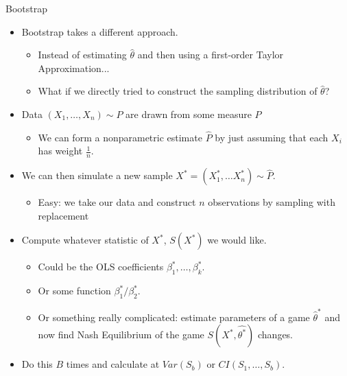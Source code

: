 \begin{frame}[allowframebreaks]{Bootstrap}
\vspace{-10pt}
  \begin{itemize}
  \item Bootstrap takes a different approach.
  \begin{itemize}
  \item Instead of estimating $\hat{\theta}$ and then using a first-order Taylor Approximation...
  \item What if we directly tried to construct the \alert{sampling distribution} of $\hat{\theta}$?
  \end{itemize}
  
\framebreak
 
  \item Data $(X_1,\ldots,X_n) \sim P$ are drawn from some measure $P$
  \begin{itemize}
  \item We can form a \alert{nonparametric estimate} $\hat{P}$ by just assuming that each $X_i$ has weight $\frac{1}{n}$.
  \end{itemize}
  \item We can then simulate a new sample $X^{*} = (X_1^{*},\ldots X_n^{*}) \sim \hat{P}$.
  \begin{itemize}
  \item Easy: we take our data and construct $n$ observations by \alert{sampling with replacement} 
  \end{itemize}
  \item Compute whatever statistic of $X^{*}$, $S(X^*)$ we would like.
  \begin{itemize}
  \item Could be the OLS coefficients $\beta_1^{*},\ldots, \beta_k^{*}$.
  \item Or some function $\beta_1^{*}/\beta_2^{*}$.
  \item Or something really complicated: estimate parameters of a game $\hat{\theta}^*$ and now find Nash Equilibrium of the game $S(X^{*},\hat{\theta^*})$ changes.
  \end{itemize}
  \item Do this $B$ times and calculate at $Var(S_b)$ or $CI(S_1,\ldots, S_b)$.
  \end{itemize}
\end{frame}
  
